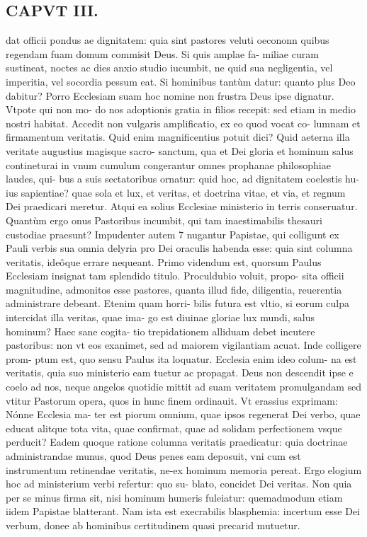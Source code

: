 \documentclass{article}
\begin{document}
\begin{pages}
\section*{CAPVT III. }
\marginpar{[ p.39 ]}\pstart dat officii pondus ae dignitatem: quia sint pastores veluti oecononn quibus regendam fuam domum commisit Deus. Si quis amplae fa- miliae curam sustineat, noctes ac dies anxio studio iucumbit, ne quid sua negligentia, vel imperitia, vel socordia pessum eat. Si hominibus tantùm datur: quanto plus Deo dabitur? Porro Ecclesiam suam hoc nomine non frustra Deus ipse dignatur. Vtpote qui non mo- do nos adoptionis gratia in filios recepit: sed etiam in medio nostri habitat. Accedit non vulgaris amplificatio, ex eo quod vocat co- lumnam et firmamentum veritatis. Quid enim magnificentius potuit dici? Quid aeterna illa veritate augustius magisque sacro- sanctum, qua et Dei gloria et hominum salus contineturai in vnum cumulum congerantur omnes prophanae philosophiae laudes, qui- bus a suis sectatoribus ornatur: quid hoc, ad dignitatem coelestis hu- ius sapientiae? quae sola et lux, et veritas, et doctrina vitae, et via, et regnum Dei praedicari meretur. Atqui ea solius Ecclesiae ministerio in terris conseruatur. Quantùm ergo onus Pastoribus incumbit, qui tam inaestimabilis thesauri custodiae praesunt? Impudenter autem 7 nugantur Papistae, qui colligunt ex Pauli verbis sua omnia delyria pro Dei oraculis habenda esse: quia sint columna veritatis, ideôque errare nequeant. Primo videndum est, quorsum Paulus Ecclesiam insignat tam splendido titulo. Proculdubio voluit, propo- sita officii magnitudine, admonitos esse pastores, quanta illud fide, diligentia, reuerentia administrare debeant. Etenim quam horri- bilis futura est vltio, si eorum culpa intercidat illa veritas, quae ima- go est diuinae gloriae lux mundi, salus hominum? Haec sane cogita- tio trepidationem alliduam debet incutere pastoribus: non vt eos exanimet, sed ad maiorem vigilantiam acuat. Inde colligere prom- ptum est, quo sensu Paulus ita loquatur. Ecclesia enim ideo colum- na est veritatis, quia suo ministerio eam tuetur ac propagat. Deus non descendit ipse e coelo ad nos, neque angelos quotidie mittit ad suam veritatem promulgandam sed vtitur Pastorum opera, quos in hunc finem ordinauit. Vt erassius exprimam: Nónne Ecclesia ma- ter est piorum omnium, quae ipsos regenerat Dei verbo, quae educat alitque tota vita, quae confirmat, quae ad solidam perfectionem vsque perducit? Eadem quoque ratione columna veritatis praedicatur: quia doctrinae administrandae munus, quod Deus penes eam deposuit, vni cum est instrumentum retinendae veritatis, ne-ex hominum memoria pereat. Ergo elogium hoc ad ministerium verbi refertur: quo su- blato, concidet Dei veritas. Non quia per se minus firma sit, nisi hominum humeris fuleiatur: quemadmodum etiam iidem Papistae blatterant. Nam ista est execrabilis blasphemia: incertum esse Dei verbum, donee ab hominibus certitudinem quasi precarid mutuetur.  \pend

\end{pages}
\end{document}
